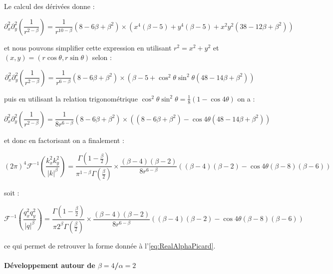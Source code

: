 \noindent Le calcul des dérivées donne :

\begin{equation}
    \partial_x^2\partial_y^2\left( \frac{1}{r^{2-\beta}} \right) = \frac{1}{r^{10-\beta}}(8-6\beta+\beta^2)\times\left(x^4(\beta-5)+y^4(\beta-5)+x^2y^2(38-12\beta+\beta^2)\right)
\end{equation}

\noindent et nous pouvons simplifier cette expression en utilisant  $r^2=x^2+y^2$ et $(x,y)=(r\cos\theta,r\sin\theta)$ selon :

\begin{equation}
    \partial_x^2\partial_y^2\left( \frac{1}{r^{2-\beta}} \right) = \frac{1}{r^{6-\beta}}(8-6\beta+\beta^2)\times\left(\beta-5+\cos^2\theta\sin^2\theta(48-14\beta+\beta^2)\right)
\end{equation}

\noindent puis en utilisant la relation trigonométrique $\cos^2\theta\sin^2\theta = \frac{1}{8}(1-\cos4\theta)$ on a :

\begin{equation}
    \partial_x^2\partial_y^2\left( \frac{1}{r^{2-\beta}} \right) = \frac{1}{8r^{6-\beta}}(8-6\beta+\beta^2)\times\left((8-6\beta+\beta^2)-\cos4\theta(48-14\beta+\beta^2)\right)
\end{equation}

\noindent et donc en factorisant on a finalement :

\begin{equation}
    (2\pi)^4\mathcal{F}^{-1}\left( \frac{k_x^2k_y^2}{\lvert k \rvert^\beta} \right) = \frac{\Gamma\left( 1-\frac{\beta}{2} \right)}{\pi^{1-\beta}\Gamma\left( \frac{\beta}{2} \right)}\times\frac{(\beta-4)(\beta-2)}{8r^{6-\beta}}\left( (\beta-4)(\beta-2)-\cos4\theta(\beta-8)(\beta-6) \right)
\end{equation}

\noindent soit :

\begin{equation}
    \mathcal{F}^{-1}\left( \frac{q_x^2q_y^2}{\lvert q \rvert^\beta} \right) = \frac{\Gamma\left( 1-\frac{\beta}{2} \right)}{\pi 2^\beta\Gamma\left( \frac{\beta}{2} \right)}\times\frac{(\beta-4)(\beta-2)}{8r^{6-\beta}}\left( (\beta-4)(\beta-2)-\cos4\theta(\beta-8)(\beta-6) \right)
\end{equation}

\noindent ce qui permet de retrouver la forme donnée à l'\autoref{eq:RealAlphaPicard}.


\paragraph{Développement autour de $\beta = 4$/$\alpha=2$}

